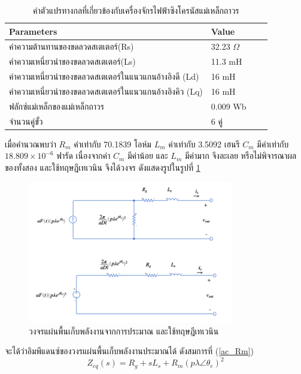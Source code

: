 \documentclass[11pt,a4paper]{article}
\begin{document}
\begin{table}[H]
    \centering
    \begin{tabular}{ | l | l | l | p{5cm} |}
        \hline
        \textbf{Parameters}                              & \textbf{Value} \\ \hline
        ค่าความต้านทานของขดลวดสเตเตอร์(Rs)                  & 32.23 $\Omega$ \\ \hline
        ค่าความเหนี่ยวนำของขดลวดสเตเตอร์(Ls)                 & 11.3 mH        \\ \hline
        ค่าความเหนี่ยวนำของขดลวดสเตเตอร์ในแนวแกนอ้างอิงดี (Ld)  & 16 mH          \\ \hline
        ค่าความเหนี่ยวนำของขดลวดสเตเตอร์ในแนวแกนอ้างอิงคิว (Lq) & 16 mH          \\ \hline
        ฟลักซ์แม่เหล็กของแม่เหล็กถาวร                          & 0.009 Wb       \\ \hline
        จำนวนคู่ขั้ว                                         & 6 คู่            \\ \hline
    \end{tabular}
    \caption{ค่าตัวแปรทางกลที่เกี่ยวข้องกับเครื่องจักรไฟฟ้าซิงโครนัสแม่เหล็กถาวร\cite{GpH:01}}
    \label{pmsm_param}
\end{table}
เมื่อคำนวณพบว่า $R_{m}$ ค่าเท่ากับ 70.1839 โอห์ม $L_{m}$  ค่าเท่ากับ 3.5092 เฮนรี $C_{m}$  มีค่าเท่ากับ $18.809 \times 10^{-6}$ ฟารัด เนื่องจากค่า $C_{m}$ มีค่าน้อย และ $L_{m}$ มีค่ามาก จึงละเลย หรือไม่พิจารณาผลของทั้งสอง และใช้ทฤษฎีเทเวนิน จึงได้วงจร ดังแสดงรูปในรูปที่ \ref{approx_Rm}
\begin{figure}[H]
    \begin{center}
        \includegraphics[width=0.8\textwidth]{approx_Rm.png}
    \end{center}
    \caption{วงจรแผ่นพื้นเก็บพลังงานจากการประมาณ และใช้ทฤษฎีเทเวนิน}
    \label{approx_Rm}
\end{figure}
จะได้ว่าอิมพีแดนซ์ของวงรแผ่นพื้นเก็บพลังงานประมาณได้ ดังสมการที่ (\ref{ac_Rm})
\begin{equation} \label{ac_Rm}
    Z_{eq}(s)=  R_{g} + sL_{s} + R_{m}(p\lambda \angle \theta_{e})^2
\end{equation}
\end{document}
